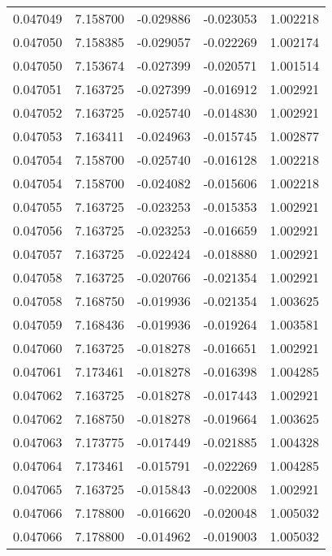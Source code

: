 \begin{tabular}{lrrrr}
0.047049    &  7.158700 & -0.029886 & -0.023053 &             1.002218 \\
0.047050    &  7.158385 & -0.029057 & -0.022269 &             1.002174 \\
0.047050    &  7.153674 & -0.027399 & -0.020571 &             1.001514 \\
0.047051    &  7.163725 & -0.027399 & -0.016912 &             1.002921 \\
0.047052    &  7.163725 & -0.025740 & -0.014830 &             1.002921 \\
0.047053    &  7.163411 & -0.024963 & -0.015745 &             1.002877 \\
0.047054    &  7.158700 & -0.025740 & -0.016128 &             1.002218 \\
0.047054    &  7.158700 & -0.024082 & -0.015606 &             1.002218 \\
0.047055    &  7.163725 & -0.023253 & -0.015353 &             1.002921 \\
0.047056    &  7.163725 & -0.023253 & -0.016659 &             1.002921 \\
0.047057    &  7.163725 & -0.022424 & -0.018880 &             1.002921 \\
0.047058    &  7.163725 & -0.020766 & -0.021354 &             1.002921 \\
0.047058    &  7.168750 & -0.019936 & -0.021354 &             1.003625 \\
0.047059    &  7.168436 & -0.019936 & -0.019264 &             1.003581 \\
0.047060    &  7.163725 & -0.018278 & -0.016651 &             1.002921 \\
0.047061    &  7.173461 & -0.018278 & -0.016398 &             1.004285 \\
0.047062    &  7.163725 & -0.018278 & -0.017443 &             1.002921 \\
0.047062    &  7.168750 & -0.018278 & -0.019664 &             1.003625 \\
0.047063    &  7.173775 & -0.017449 & -0.021885 &             1.004328 \\
0.047064    &  7.173461 & -0.015791 & -0.022269 &             1.004285 \\
0.047065    &  7.163725 & -0.015843 & -0.022008 &             1.002921 \\
0.047066    &  7.178800 & -0.016620 & -0.020048 &             1.005032 \\
0.047066    &  7.178800 & -0.014962 & -0.019003 &             1.005032 \\

\end{tabular}
